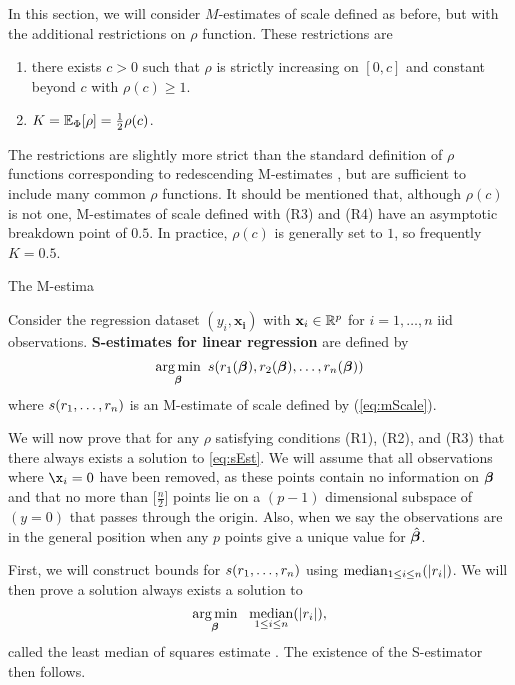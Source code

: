 In this section, we will consider $M$-estimates of scale defined as before, but with the additional restrictions on $\rho$ function. These restrictions are
\begin{enumerate}[(R1)]\addtocounter{enumi}{3}
    \item there exists $c > 0$ such that $\rho$ is strictly increasing on $[0,c]$ and constant beyond $c$ with $\rho(c) \geq 1$.
    \item $K = \mathbb{E}_\Phi[\rho] = \frac{1}{2} \rho(c)$.
\end{enumerate}
The restrictions are slightly more strict than the standard definition of $\rho$ functions corresponding to redescending M-estimates \cite{maronna2019robust}, but are sufficient to include many common $\rho$ functions. It should be mentioned that, although $\rho(c)$ is not one, M-estimates of scale defined with (R3) and (R4) have an asymptotic breakdown point of $0.5$. In practice, $\rho(c)$ is generally set to $1$, so frequently $K=0.5$.

The M-estima
\begin{defn}
\label{def:sEst}
Consider the regression dataset $(y_i, \mathbf{x_i})$ with $\mathbf{x}_i \in \mathbb{R}^p$ for $i = 1,\hdots,n$ iid observations. \textbf{S-estimates for linear regression} are defined by
 \begin{equation}
\label{eq:sEst}
     \operatorname*{arg\,min}_{\bm{\beta}}\ s(r_1(\bm{\beta}), r_2(\bm{\beta}), \hdots, r_n(\bm{\beta}))
 \end{equation}
 where $s(r_1,\hdots, r_n)$ is an M-estimate of scale defined by (\ref{eq:mScale}). \\
\end{defn}

We will now prove that for any $\rho$ satisfying conditions (R1), (R2), and (R3) that there always exists a solution to \ref{eq:sEst}. 
We will assume that all observations where $\x_i=0$ have been removed, as these points contain no information on $\bm{\beta}$ and that no more than $\big[\frac{n}{2}\big]$ points lie on a $(p-1)$ dimensional subspace of $(y=0)$ that passes through the origin. Also, when we say the observations are in the general position when any $p$ points give a unique value for $\hat{\bm{\beta}}$.

First, we will construct bounds for $s(r_1,\hdots, r_n)$ using $\operatorname*{median}_{1\leq i \leq n}(|r_i|) $. We will then prove a solution always exists a solution to 
\begin{equation}
    \operatorname*{arg\,min}_{\bm{\beta}}\ \  \operatorname*{median}_{1\leq i \leq n}(|r_i|),
\end{equation}
called the least median of squares estimate \cite{rousseeuw1984least}. The existence of the S-estimator then follows.

